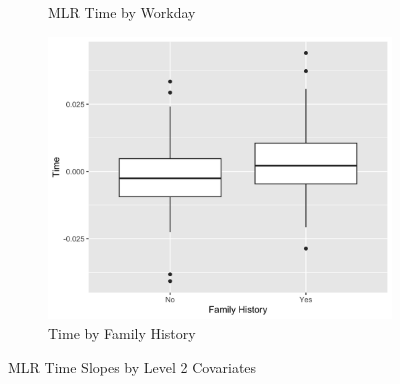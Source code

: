 \documentclass[12pt,twoside,letterpaper]{article}
\theoremstyle{definition}
\theoremstyle{definition}
\begin{document}
\begin{figure}
\begin{subfigure}[b]{0.32\textwidth}
        \caption[]%
        {{\small MLR Time by Workday}}
        \label{fig: time v day}
        \end{subfigure}
        \hfill
        \begin{subfigure}[b]{0.32\textwidth}
        \centering
        \includegraphics[width=\textwidth]{pics/mlr time by fh.png}
        \caption[]%
        {{\small Time by Family History}}
        \label{fig: time v fh}
        \end{subfigure}
        \caption[]
        {\small MLR Time Slopes by Level 2 Covariates}
        \label{fig: time v lv2}
        \end{figure}
    
\end{document}
